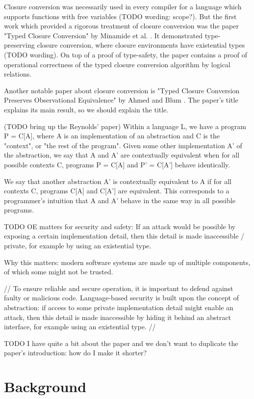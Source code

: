 \documentclass[bsc,frontabs,oneside,singlespacing,parskip,deptreport]{infthesis}
\theoremstyle{definition}
\theoremstyle{lemma}
\begin{document}
Closure conversion was necessarily used in every compiler for a
language which supports functions with free variables (TODO wording:
scope?). But the first work which provided a rigorous treatment of
closure conversion was the paper "Typed Closure Conversion" by
Minamide et al. \cite{TODO}. It demonstrated type-preserving closure
conversion, where closure environments have existential types (TODO
wording). On top of a proof of type-safety, the paper contains a proof
of operational correctness of the typed closure conversion algorithm
by logical relations.

Another notable paper about closure conversion is "Typed Closure
Conversion Preserves Observational Equivalence" by Ahmed and Blum
\cite{TODO}. The paper's title explains its main result, so we should
explain the title.

(TODO bring up the Reynolds' paper) Within a language L, we have a
program P = C[A], where A is an implementation of an abstraction and C
is the "context", or "the rest of the program". Given some other
implementation A' of the abstraction, we say that A and A' are
contextually equivalent when for all possible contexts C, programs P =
C[A] and P' = C[A'] behave identically.

We say that another abstraction A' is contextually equivalent to A if
for all contexts C, programs C[A] and C[A'] are equivalent. This
corresponds to a programmer's intuition that A and A' behave in the
same way in all possible programs.

TODO OE matters for security and safety: If an attack would be
possible by exposing a certain implementation detail, then this detail
is made inaccessible / private, for example by using an existential
type.

Why this matters: modern software systems are made up of multiple
components, of which some might not be trusted.

// To ensure reliable and secure operation, it is important to defend
against faulty or malicious code. Language-based security is built
upon the concept of abstraction: if access to some private
implementation detail might enable an attack, then this detail is made
inaccessible by hiding it behind an abstract interface, for example
using an existential type. //

TODO I have quite a bit about the paper and we don't want to duplicate
the paper's introduction: how do I make it shorter?

\chapter{Background}
\end{document}
